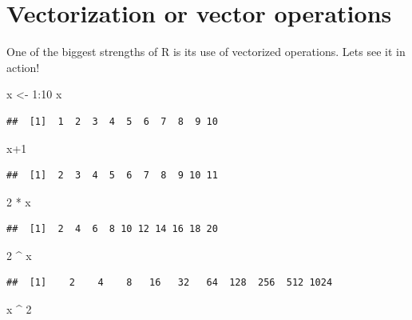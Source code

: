 \documentclass[
]{book}
\newenvironment{Shaded}{\begin{snugshade}}{\end{snugshade}}
\newcommand{\DecValTok}[1]{\textcolor[rgb]{0.00,0.00,0.81}{#1}}
\newcommand{\NormalTok}[1]{#1}
\newcommand{\OtherTok}[1]{\textcolor[rgb]{0.56,0.35,0.01}{#1}}
\newcommand{\SpecialCharTok}[1]{\textcolor[rgb]{0.00,0.00,0.00}{#1}}
\theoremstyle{definition}
\theoremstyle{definition}
\theoremstyle{definition}
\theoremstyle{definition}
\theoremstyle{remark}
\begin{document}
\hypertarget{vectorization-or-vector-operations}{%
\section{Vectorization or vector operations}\label{vectorization-or-vector-operations}}

One of the biggest strengths of R is its use of vectorized operations. Lets see it in action!

\begin{Shaded}
\begin{Highlighting}[]
\NormalTok{x }\OtherTok{\textless{}{-}} \DecValTok{1}\SpecialCharTok{:}\DecValTok{10}
\NormalTok{x}
\end{Highlighting}
\end{Shaded}

\begin{verbatim}
##  [1]  1  2  3  4  5  6  7  8  9 10
\end{verbatim}

\begin{Shaded}
\begin{Highlighting}[]
\NormalTok{x}\SpecialCharTok{+}\DecValTok{1}
\end{Highlighting}
\end{Shaded}

\begin{verbatim}
##  [1]  2  3  4  5  6  7  8  9 10 11
\end{verbatim}

\begin{Shaded}
\begin{Highlighting}[]
\DecValTok{2} \SpecialCharTok{*}\NormalTok{ x}
\end{Highlighting}
\end{Shaded}

\begin{verbatim}
##  [1]  2  4  6  8 10 12 14 16 18 20
\end{verbatim}

\begin{Shaded}
\begin{Highlighting}[]
\DecValTok{2} \SpecialCharTok{\^{}}\NormalTok{ x}
\end{Highlighting}
\end{Shaded}

\begin{verbatim}
##  [1]    2    4    8   16   32   64  128  256  512 1024
\end{verbatim}

\begin{Shaded}
\begin{Highlighting}[]
\NormalTok{x }\SpecialCharTok{\^{}} \DecValTok{2}
\end{Highlighting}
\end{Shaded}
\end{document}
